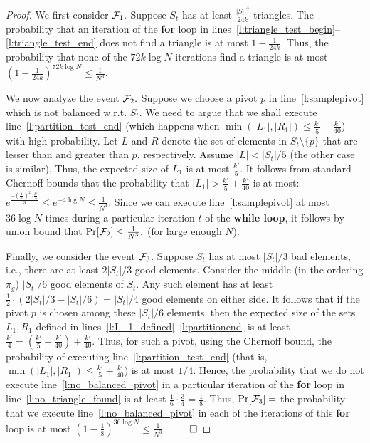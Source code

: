 \documentclass[11pt]{llncs}
\begin{document}
\begin{proof}
We first consider ${\cal F}_1.$ Suppose $S_t$ has at least  $\frac{|S_t|^3}{24 k}$ triangles. The probability that an iteration of the {\bf for} loop in lines~\ref{l:triangle_test_begin}--\ref{l:triangle_test_end} does not find a triangle is at most $1-\frac{1}{24k}$. Thus, the probability that none of the $72 k \log N$ iterations find a triangle is at most 
 $\left(1 - \frac{1}{24 k} \right)^{72 k \log N} \leq \frac{1}{N^3}.$

 We now analyze the event ${\cal F}_2. $ Suppose we choose a pivot $p$ in line~\ref{l:samplepivot} which is not balanced w.r.t. $S_t$. We need to argue that we shall execute line~\ref{l:partition_test_end} (which happens when $\min(|L_1|, |R_1|) \leq \frac{k'}{5} + \frac{k'}{40}$) with high probability. Let $L$ and $R$ denote the set of elements in $S_t \setminus \{p\}$ that are lesser than and greater than $p$, respectively. Assume $|L| < |S_t|/5$ (the other case is similar). Thus, the expected size of $L_1$ is at most $\frac{k'}{5}$. It follows from standard Chernoff bounds that the probability that $|L_1| > \frac{k'}{5} + \frac{k'}{40}$ is at most:
 $e^{\frac{-\left(\frac{1}{40}\right)^2 \cdot \frac{k'}{5}}{3}} \leq e^{-4 \log N} \leq \frac{1}{N^4}$.
Since we can execute line~\ref{l:samplepivot} at most $36 \log N$ times during a particular iteration $t$ of the {\bf while loop}, it follows by union bound that $\Pr[{\cal F}_2] \leq \frac{1}{N^3}.$ (for large enough $N$).

Finally, we consider the event ${\cal F}_3$. Suppose $S_t$ has at most $|S_t|/3$ bad elements, i.e., there are at least $2|S_t|/3$ good elements. Consider the middle (in the ordering $\pi_g$) $|S_t| / 6$ good elements of $S_t$. Any such element has at least $\frac{1}{2} \cdot (2|S_t| / 3 - |S_t| / 6) = |S_t| / 4 $ good elements on either side.  It follows that if the pivot $p$ is chosen among these $|S_t|/6$ elements, then the expected size of the sets $L_1, R_1$ defined in lines~\ref{l:L_1_defined}--\ref{l:partitionend} is at least $\frac{k'}{4} = (\frac{k'}{5} + \frac{k'}{40}) + \frac{k'}{40}$. Thus, for such a pivot, using the Chernoff bound, the probability of executing line~\ref{l:partition_test_end} (that is, $\min(|L_1|, |R_1|) \leq \frac{k'}{5} + \frac{k'}{40}$) is at most  $1/4$.
    Hence, the probability that we do not execute line~\ref{l:no_balanced_pivot} in a particular iteration of the {\bf for} loop in line~\ref{l:no_triangle_found} is at least $\frac{1}{6} \cdot \frac{3}{4} = \frac{1}{8}.$ Thus, $\Pr[{\cal F}_3] = $ the probability that we execute line~\ref{l:no_balanced_pivot} in each of the iterations of this {\bf for} loop is at most 
$\left(1 - \frac{1}{8} \right)^{36 \log N} \leq \frac{1}{N^3}.$
$\qed$
\end{proof}
\end{document}
